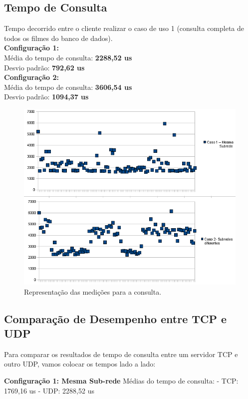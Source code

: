 \documentclass[11pt,twoside]{article}
\begin{document}
\subsection{Tempo de Consulta}
Tempo decorrido entre o cliente realizar o caso de uso 1 (consulta completa de todos os filmes do banco de dados).\\
\textbf{Configuração 1: }\\
Média do tempo de consulta: \textbf{2288,52 us}\\
Desvio padrão: \textbf{792,62 us}\\
\textbf{Configuração 2: }\\
Média do tempo de consulta: \textbf{3606,54 us}\\
Desvio padrão: \textbf{1094,37 us}\\
\begin{figure}[htb]
  \centering
  \includegraphics[width=15cm]{consulta.png} 
  \caption{Representação das medições para a consulta.}
  \label{fig:rtt}
\end{figure}

\subsection{Comparação de Desempenho entre TCP e UDP}
Para comparar os resultados de tempo de consulta entre um servidor TCP e outro UDP, vamos colocar os tempos lado a lado:

\textbf{Configuração 1: Mesma Sub-rede}
Médias do tempo de consulta:
- TCP: 1769,16 us
- UDP: 2288,52 us
\end{document}
